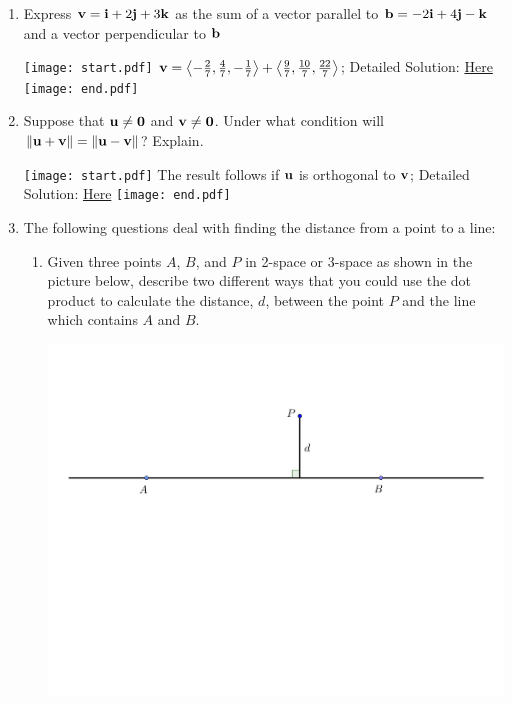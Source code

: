 \documentclass[12pt]{article}
\begin{document}
\begin{enumerate}
\begin{enumerate}
\end{enumerate}

\item Express ${\bf v}={\bf i}+2{\bf j}+3{\bf k}$ as the sum of a vector parallel to ${\bf b}=-2{\bf i}+4{\bf j}-{\bf k}$ and a vector perpendicular to ${\bf b}$

\texttt{[image: start.pdf]}
{{${\bf v}=\left\langle-\frac{2}{7},\frac{4}{7},-\frac{1}{7}\right\rangle+\left\langle \frac{9}{7},\frac{10}{7},\frac{22}{7}\right\rangle$; Detailed Solution: \textcolor{blue}{\href{http://www.math.drexel.edu/classes/Calculus/resources/Math200HW/Solutions/03_200_Dot_Product_08.pdf}{Here}} }}
\texttt{[image: end.pdf]}


\item Suppose that ${\bf u} \neq {\bf 0}$ and ${\bf v} \neq {\bf 0}$.  Under what condition will $\|{\bf u}+{\bf v}\|=\|{\bf u}-{\bf v}\|$?  Explain.

\texttt{[image: start.pdf]}
{{The result follows if ${\bf u}$ is orthogonal to ${\bf v}$; Detailed Solution: \textcolor{blue}{\href{http://www.math.drexel.edu/classes/Calculus/resources/Math200HW/Solutions/03_200_Dot_Product_09.pdf}{Here}}}}
\texttt{[image: end.pdf]}


\newpage

\item The following questions deal with finding the distance from a point to a line:

\begin{enumerate}

\item Given three points $A$, $B$, and $P$ in 2-space or 3-space as shown in the picture below, describe two different ways that you could use the dot product to calculate the distance, $d$, between the point $P$ and the line which contains $A$ and $B$.

\begin{center}
\includegraphics[scale=0.5]{length.pdf}
\end{center}


\end{enumerate}
\end{enumerate}
\end{document}
